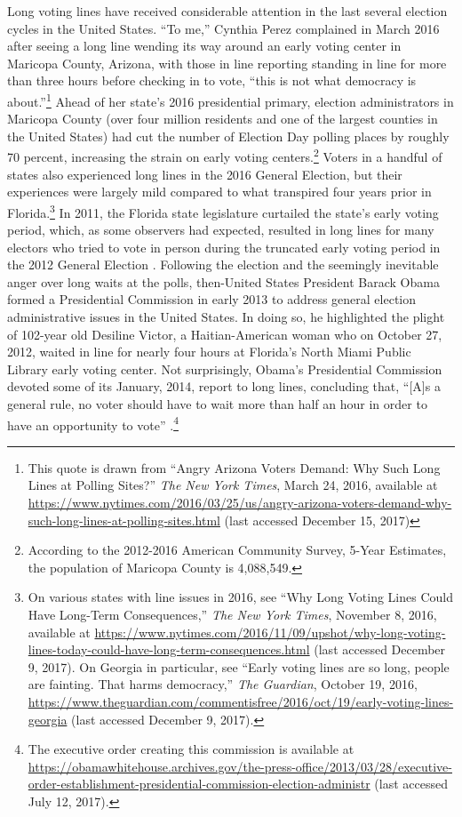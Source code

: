 \documentclass[12pt,titlepage]{article}
\begin{document}
Long voting lines have received considerable attention in the last several election
cycles in the United States.  ``To me,'' Cynthia Perez complained in
March 2016 after seeing a long line wending its way around an early
voting center in Maricopa County, Arizona, with those in line
reporting standing in line for more than three hours before checking
in to vote, ``this is not what democracy is about.''\footnote{This
  quote is drawn from ``Angry Arizona Voters Demand: Why Such Long
  Lines at Polling Sites?'' \emph{The New York Times}, March 24, 2016,
  available at
  \url{https://www.nytimes.com/2016/03/25/us/angry-arizona-voters-demand-why-such-long-lines-at-polling-sites.html}
  (last accessed December 15, 2017)} Ahead of her state's 2016
presidential primary, election administrators in Maricopa County (over
four million residents and one of the largest counties in the United
States) had cut the number of Election Day polling places by roughly
70 percent, increasing the strain on early voting
centers.\footnote{According to the 2012-2016 American Community
  Survey, 5-Year Estimates, the population of Maricopa County is
  4,088,549.}  Voters in a handful of states also experienced long
lines in the 2016 General Election, but their experiences were largely
mild compared to what transpired four years prior in
Florida.\footnote{On various states with line issues in 2016, see
  ``Why Long Voting Lines Could Have Long-Term Consequences,''
  \emph{The New York Times}, November 8, 2016, available at
  \url{https://www.nytimes.com/2016/11/09/upshot/why-long-voting-lines-today-could-have-long-term-consequences.html}
  (last accessed December 9, 2017).  On Georgia in particular, see
  ``Early voting lines are so long, people are fainting. That harms
  democracy,'' \emph{The Guardian}, October 19, 2016,
  \url{https://www.theguardian.com/commentisfree/2016/oct/19/early-voting-lines-georgia}
  (last accessed December 9, 2017).}  In 2011, the Florida state
legislature curtailed the state's early voting period, which, as some
observers had expected, resulted in long lines for many electors who
tried to vote in person during the truncated early voting period in
the 2012 General Election \citep{herron_smith2014}.  Following the
election and the seemingly inevitable anger over long waits at the
polls, then-United States President Barack Obama formed a Presidential
Commission in early 2013 to address general election administrative
issues in the United States.  In doing so, he highlighted the plight
of 102-year old Desiline Victor, a Haitian-American woman who on
October 27, 2012, waited in line for nearly four hours at Florida's
North Miami Public Library early voting center.  Not surprisingly,
Obama's Presidential Commission devoted some of its January, 2014,
report to long lines, concluding that, ``[A]s a general rule, no voter
should have to wait more than half an hour in order to have an
opportunity to vote'' \citep[p.\ 13,][]{pcea:2014}.\footnote{The
  executive order creating this commission is available at
  \url{https://obamawhitehouse.archives.gov/the-press-office/2013/03/28/executive-order-establishment-presidential-commission-election-administr}
  (last accessed July 12, 2017).}
\end{document}
